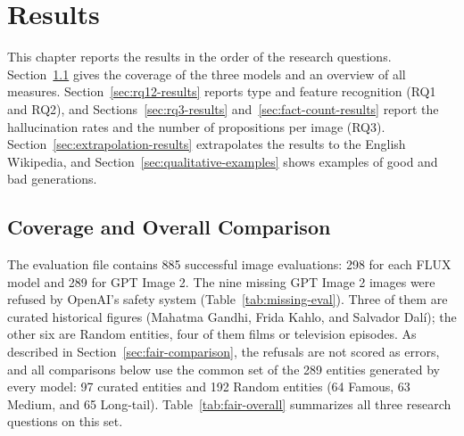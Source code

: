 \chapter{Results}
\label{chap:results}

This chapter reports the results in the order of the research questions.
Section~\ref{sec:coverage} gives the coverage of the three models and an
overview of all measures. Section~\ref{sec:rq12-results} reports type and
feature recognition (RQ1 and RQ2), and Sections~\ref{sec:rq3-results}
and~\ref{sec:fact-count-results} report the hallucination rates and the number
of propositions per image (RQ3). Section~\ref{sec:extrapolation-results}
extrapolates the results to the English Wikipedia, and
Section~\ref{sec:qualitative-examples} shows examples of good and bad
generations.

\section{Coverage and Overall Comparison}
\label{sec:coverage}

The evaluation file contains 885 successful image evaluations: 298 for each
FLUX model and 289 for GPT Image 2. The nine missing GPT Image 2 images were
refused by OpenAI's safety system (Table~\ref{tab:missing-eval}). Three
of them are curated historical figures (Mahatma Gandhi, Frida Kahlo, and
Salvador Dal\'{i}); the other six are Random entities, four of them films or
television episodes. As described in Section~\ref{sec:fair-comparison}, the
refusals are not scored as errors, and all comparisons below use the common set
of the 289 entities generated by every model: 97
curated entities and 192 Random entities (64 Famous, 63 Medium, and 65
Long-tail). Table~\ref{tab:fair-overall} summarizes all three research
questions on this set.

